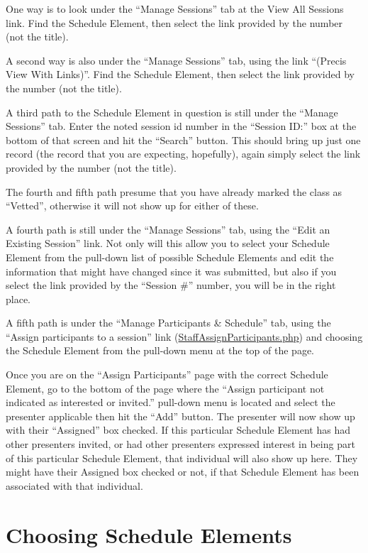 \documentclass[tablesignature]{scrartcl}
\begin{document}
   One way is to look under the ``Manage Sessions'' tab at the View All
   Sessions link.  Find the Schedule Element, then select the link
   provided by the number (not the title).

   A second way is also under the ``Manage Sessions'' tab, using the
   link ``(Precis View With Links)''.  Find the Schedule Element, then
   select the link provided by the number (not the title).

   A third path to the Schedule Element in question is still under the
   ``Manage Sessions'' tab. Enter the noted session id number in the
   ``Session ID:'' box at the bottom of that screen and hit the ``Search''
   button.  This should bring up just one record (the record that you
   are expecting, hopefully), again simply select the link provided by
   the number (not the title).

   The fourth and fifth path presume that you have already marked the
   class as ``Vetted'', otherwise it will not show up for either of
   these.

   A fourth path is still under the ``Manage Sessions'' tab, using the
   ``Edit an Existing Session'' link.  Not only will this allow you to
   select your Schedule Element from the pull-down list of possible
   Schedule Elements and edit the information that might have changed
   since it was submitted, but also if you select the link provided by
   the ``Session \#'' number, you will be in the right place.

   A fifth path is under the ``Manage Participants \& Schedule'' tab,
   using the ``Assign participants to a session'' link
   (\hyperref[StaffAssignParticipants.php]{StaffAssignParticipants.php}) and choosing the Schedule Element
   from the pull-down menu at the top of the page.

   Once you are on the ``Assign Participants'' page with the correct
   Schedule Element, go to the bottom of the page where the ``Assign
   participant not indicated as interested or invited.'' pull-down menu
   is located and select the presenter applicable then hit the ``Add''
   button.  The presenter will now show up with their ``Assigned'' box
   checked.  If this particular Schedule Element has had other
   presenters invited, or had other presenters expressed interest in
   being part of this particular Schedule Element, that individual
   will also show up here.  They might have their Assigned box checked
   or not, if that Schedule Element has been associated with that
   individual.
\section{Choosing Schedule Elements}
\label{sec-6}
\end{document}
